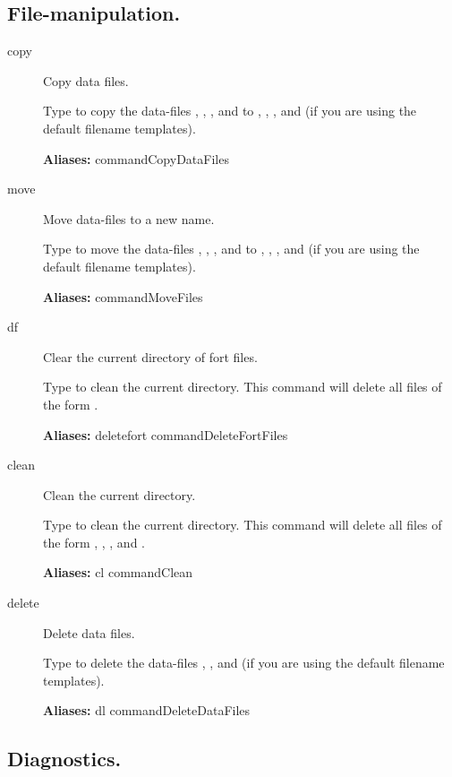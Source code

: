 \documentclass[12pt]{report}
\begin{document}
\subsection{File-manipulation.} \label{sec:clui_ref_files}
\begin{description}
\item[copy]
Copy data files.

    Type  to copy the data-files ,
    , , and  to ,
    , , and  (if you are using the
    default filename templates).
    
\textbf{Aliases:} commandCopyDataFiles

\item[move]
Move data-files to a new name.

    Type  to move the data-files ,
    , , and  to ,
    , , and  (if you are using the
    default filename templates).  

\textbf{Aliases:} commandMoveFiles

\item[df]
Clear the current directory of fort files.

    Type  to clean the current directory.  This command will
    delete all files of the form .
    
\textbf{Aliases:} deletefort commandDeleteFortFiles

\item[clean]
Clean the current directory.

    Type  to clean the current directory.  This command will
    delete all files of the form , ,
    , and .
    
\textbf{Aliases:}
cl commandClean

\item[delete]
Delete data files.

    Type  to delete the data-files ,
    , and  (if you are using the default
    filename templates).
    
\textbf{Aliases:} dl commandDeleteDataFiles
\end{description}

\subsection{Diagnostics.} \label{sec:clui_ref_diagnostics}
\end{document}
